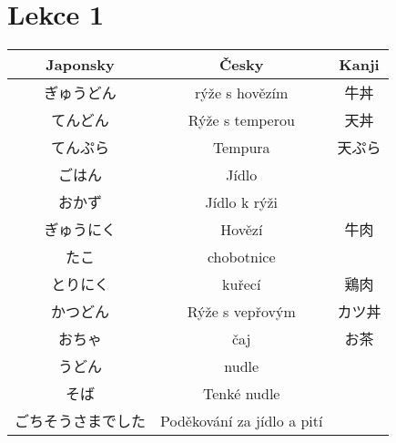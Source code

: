  \section{Lekce 1}
\begin{table}[H]
\centering
\begin{tabular}{ccc}
\hline
Japonsky & Česky                                        & Kanji \\
\hline
ぎゅうどん     & rýže s hovězím             & 牛丼  \\
てんどん      & Rýže s temperou            & 天丼  \\
てんぷら      & Tempura                    & 天ぷら \\
ごはん       & Jídlo                      &     \\
おかず       & Jídlo k rýži               &     \\
ぎゅうにく     & Hovězí                     & 牛肉  \\
たこ        & chobotnice                 &     \\
とりにく      & kuřecí                     & 鶏肉  \\
かつどん      & Rýže s vepřovým            & カツ丼 \\
おちゃ       & čaj                        & お茶  \\
うどん       & nudle                      &     \\
そば        & Tenké nudle                &     \\
ごちそうさまでした & Poděkování za jídlo a pití &   \\
\hline
\end{tabular}
\end{table}